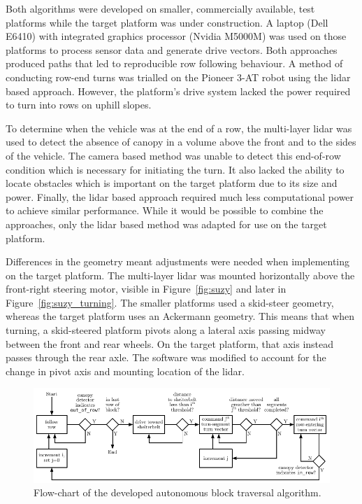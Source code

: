 \documentclass[preprint,authoryear,12pt]{elsarticle}
\begin{document}
    Both algorithms were developed on smaller, commercially available, test platforms while the target platform was under construction.
    A laptop (Dell E6410) with integrated graphics processor (Nvidia M5000M) was used on those platforms to process sensor data and generate drive vectors.
    Both approaches produced paths that led to reproducible row following behaviour.
    A method of conducting row-end turns was trialled on the Pioneer 3-AT robot using the lidar based approach.
    However, the platform's drive system lacked the power required to turn into rows on uphill slopes.

    To determine when the vehicle was at the end of a row, the multi-layer lidar was used to detect the absence of canopy in a volume above the front and to the sides of the vehicle.
    The camera based method was unable to detect this end-of-row condition which is necessary for initiating the turn.
    It also lacked the ability to locate obstacles which is important on the target platform due to its size and power.
    Finally, the lidar based approach required much less computational power to achieve similar performance.
    While it would be possible to combine the approaches, only the lidar based method was adapted for use on the target platform.

    Differences in the geometry meant adjustments were needed when implementing on the target platform.
    The multi-layer lidar was mounted horizontally above the front-right steering motor, visible in Figure~\ref{fig:suzy} and later in Figure~\ref{fig:suzy_turning}.
    The smaller platforms used a skid-steer geometry, whereas the target platform uses an Ackermann geometry.
    This means that when turning, a skid-steered platform pivots along a lateral axis passing midway between the front and rear wheels.
    On the target platform, that axis instead passes through the rear axle.
    The software was modified to account for the change in pivot axis and mounting location of the lidar.

    \begin{figure}[htb]
        \centering
        \includegraphics[width=\linewidth]{imgs/turning_diagrams/flowchart.pdf}
        \caption{
            Flow-chart of the developed autonomous block traversal algorithm.
        }
        \label{fig:turn_diagram}
    \end{figure}
\end{document}
